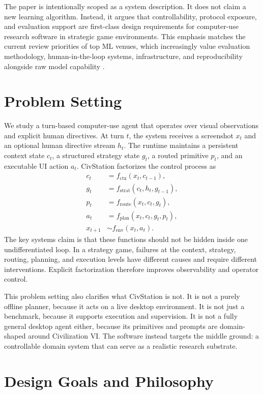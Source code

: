 The paper is intentionally scoped as a system description. It does not claim a new learning algorithm. Instead, it argues that controllability, protocol exposure, and evaluation support are first-class design requirements for computer-use research software in strategic game environments. This emphasis matches the current review priorities of top ML venues, which increasingly value evaluation methodology, human-in-the-loop systems, infrastructure, and reproducibility alongside raw model capability \cite{neurips_cfp, iclr_cfp}.

\section{Problem Setting}

We study a turn-based computer-use agent that operates over visual observations and explicit human directives. At turn $t$, the system receives a screenshot $x_t$ and an optional human directive stream $h_t$. The runtime maintains a persistent context state $c_t$, a structured strategy state $g_t$, a routed primitive $p_t$, and an executable UI action $a_t$. CivStation factorizes the control process as
\begin{align}
c_t &= f_{\mathrm{ctx}}(x_t, c_{t-1}), \\
g_t &= f_{\mathrm{strat}}(c_t, h_t, g_{t-1}), \\
p_t &= f_{\mathrm{route}}(x_t, c_t, g_t), \\
a_t &= f_{\mathrm{plan}}(x_t, c_t, g_t, p_t), \\
x_{t+1} &\sim f_{\mathrm{env}}(x_t, a_t).
\end{align}
The key systems claim is that these functions should not be hidden inside one undifferentiated loop. In a strategy game, failures at the context, strategy, routing, planning, and execution levels have different causes and require different interventions. Explicit factorization therefore improves observability and operator control.

This problem setting also clarifies what CivStation is not. It is not a purely offline planner, because it acts on a live desktop environment. It is not just a benchmark, because it supports execution and supervision. It is not a fully general desktop agent either, because its primitives and prompts are domain-shaped around Civilization VI. The software instead targets the middle ground: a controllable domain system that can serve as a realistic research substrate.

\section{Design Goals and Philosophy}

